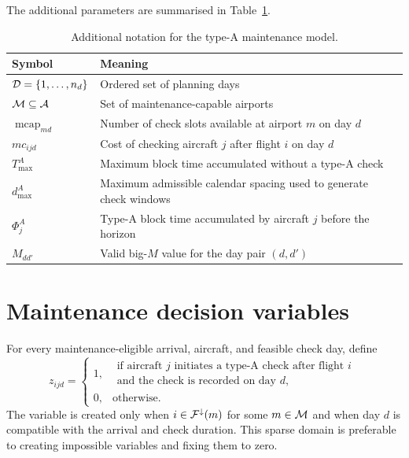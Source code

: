 The additional parameters are summarised in
Table~\ref{tab:maintenance_notation}.
\begin{table}[htbp]
    \centering
    \small
    \caption{Additional notation for the type-A maintenance model.}
    \label{tab:maintenance_notation}
    \begin{tabularx}{\textwidth}{@{}lX@{}}
        \toprule
        Symbol & Meaning \\
        \midrule
        $\mathcal{D}=\{1,\ldots,n_d\}$ & Ordered set of planning days \\
        $\mathcal{M}\subseteq\mathcal{A}$ & Set of maintenance-capable airports \\
        $\operatorname{mcap}_{md}$ & Number of check slots available at airport $m$ on day $d$ \\
        $mc_{ijd}$ & Cost of checking aircraft $j$ after flight $i$ on day $d$ \\
        $T_{\max}^{A}$ & Maximum block time accumulated without a type-A check \\
        $d_{\max}^{A}$ & Maximum admissible calendar spacing used to generate check windows \\
        $\Phi_j^A$ & Type-A block time accumulated by aircraft $j$ before the horizon \\
        $M_{dd'}$ & Valid big-$M$ value for the day pair $(d,d')$ \\
        \bottomrule
    \end{tabularx}
\end{table}

\section{Maintenance decision variables}

For every maintenance-eligible arrival, aircraft, and feasible check day,
define
\begin{equation}
    z_{ijd}=
    \begin{cases}
          1, & \substack{\text{if aircraft $j$ initiates a type-A check after flight $i$}\\
                              \text{and the check is recorded on day $d$},}\\
        0, & \text{otherwise.}
    \end{cases}
    \label{eq:maint_trigger_variable}
\end{equation}
The variable is created only when $i\in\mathcal{F}^{\downarrow}(m)$ for some
$m\in\mathcal{M}$ and when day $d$ is compatible with the arrival and check duration.
This sparse domain is preferable to creating impossible variables and fixing
them to zero.

